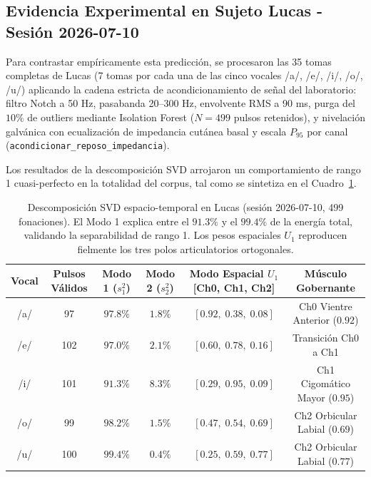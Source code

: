 \documentclass[11pt,a4paper,openany]{book}
\theoremstyle{definition}
\begin{document}
\subsection{Evidencia Experimental en Sujeto Lucas - Sesión 2026-07-10}
\label{subsec:svd_resultados_lucas}

Para contrastar empíricamente esta predicción, se procesaron las 35 tomas completas de Lucas (7 tomas por cada una de las cinco vocales /a/, /e/, /i/, /o/, /u/) aplicando la cadena estricta de acondicionamiento de señal del laboratorio: filtro Notch a 50 Hz, pasabanda 20--300 Hz, envolvente RMS a 90 ms, purga del $10\%$ de outliers mediante Isolation Forest ($N = 499$ pulsos retenidos), y nivelación galvánica con ecualización de impedancia cutánea basal y escala $P_{95}$ por canal (\texttt{acondicionar\_reposo\_impedancia}).

Los resultados de la descomposición SVD arrojaron un comportamiento de rango 1 cuasi-perfecto en la totalidad del corpus, tal como se sintetiza en el Cuadro~\ref{tab:svd_resultados_lucas}.

\begin{table}[H]
\centering
\small
\begin{tabular}{cccccc}
\toprule
\textbf{Vocal} & \textbf{Pulsos Válidos} & \textbf{Modo 1 ($s_1^2$)} & \textbf{Modo 2 ($s_2^2$)} & \textbf{Modo Espacial $U_1$ [Ch0, Ch1, Ch2]} & \textbf{Músculo Gobernante} \\
\midrule
/a/ & 97  & $\mathbf{97.8\%}$ & $1.8\%$ & $[0.92, \; 0.38, \; 0.08]$ & Ch0 Vientre Anterior ($0.92$) \\
/e/ & 102 & $\mathbf{97.0\%}$ & $2.1\%$ & $[0.60, \; 0.78, \; 0.16]$ & Transición Ch0 a Ch1 \\
/i/ & 101 & $\mathbf{91.3\%}$ & $8.3\%$ & $[0.29, \; 0.95, \; 0.09]$ & Ch1 Cigomático Mayor ($0.95$) \\
/o/ & 99  & $\mathbf{98.2\%}$ & $1.5\%$ & $[0.47, \; 0.54, \; 0.69]$ & Ch2 Orbicular Labial ($0.69$) \\
/u/ & 100 & $\mathbf{99.4\%}$ & $0.4\%$ & $[0.25, \; 0.59, \; 0.77]$ & Ch2 Orbicular Labial ($0.77$) \\
\bottomrule
\end{tabular}
\caption{Descomposición SVD espacio-temporal en Lucas (sesión 2026-07-10, 499 fonaciones). El Modo 1 explica entre el $91.3\%$ y el $99.4\%$ de la energía total, validando la separabilidad de rango 1. Los pesos espaciales $U_1$ reproducen fielmente los tres polos articulatorios ortogonales.}
\label{tab:svd_resultados_lucas}
\end{table}
\end{document}
